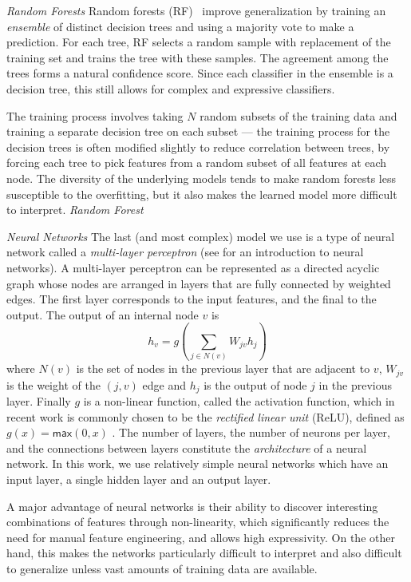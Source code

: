 \documentclass[conference]{IEEEtran}
\begin{document}
\emph{Random Forests}
%
Random forests (RF)~\cite{breiman2001random} improve generalization by training an
\emph{ensemble} of distinct decision trees and using a majority
vote to make a prediction.
For each tree, RF selects a random sample with replacement of the training
set and trains the tree with these samples.
%
The agreement among the trees forms a natural
confidence score.
%
Since each classifier in the ensemble is a decision tree, this still
allows for complex and expressive classifiers.

The training process involves taking $N$ random subsets of the training
data and training a separate decision tree on each subset --- the
training process for the decision trees is often modified slightly to
reduce correlation between trees, by forcing each tree to pick features
from a random subset of all features at each node.
%
The diversity of the underlying models tends to make random forests less
susceptible to the overfitting, but it
also makes the learned model more difficult to interpret.
\emph{Random Forest}


\emph{Neural Networks}
%
The last (and most complex) model we use is a type of neural network
called a \emph{multi-layer perceptron} (see \cite{Nielsen2015-pu} for
an introduction to neural networks).
%
A multi-layer perceptron can be represented as a directed acyclic
graph whose nodes are arranged in layers that are fully connected by
weighted edges.
%
The first layer corresponds to the input features, and the final to the
output.
%
The output of an internal node $v$ is
%
\[ h_v = g(\sum_{j \in N(v)} W_{jv} h_j ) \]
%
where $N(v)$ is the set of nodes in the previous layer that are adjacent
to $v$, $W_{jv}$ is the weight of the $(j, v)$ edge and $h_j$ is the
output of node $j$ in the previous layer.
%
Finally $g$ is a non-linear function, called the activation function,
which in recent work is commonly chosen to be the \emph{rectified linear
  unit} (ReLU), defined as $g(x) = \mathsf{max}(0,x)$
\cite{Nair2010-xg}.
%
The number of layers, the number of neurons per layer, and the
connections between layers constitute the \emph{architecture} of a
neural network.
%
In this work, we use relatively simple neural networks which have an
input layer, a single hidden layer and an output layer.

A major advantage of neural networks is their ability to discover
interesting combinations of features through non-linearity, which
significantly reduces the need for manual feature engineering, and
allows high expressivity.
%
On the other hand, this makes the networks particularly difficult to
interpret and also difficult to generalize unless vast amounts of
training data are available.
\end{document}
